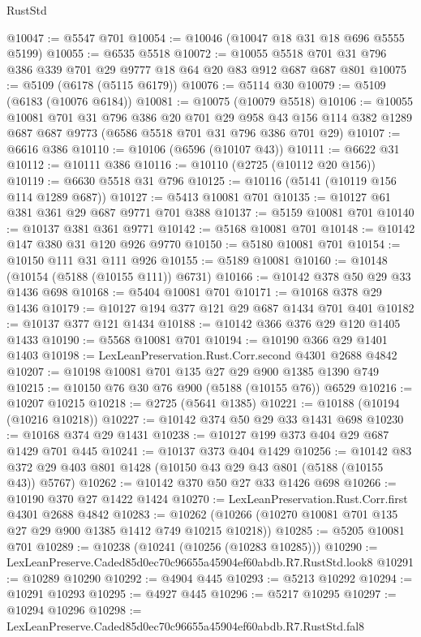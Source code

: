 \begin{lexlean}{RustStd}
\begin{coremodule}
@10047 := @5547 @701
@10054 := @10046 (@10047 @18 @31 @18 @696 @5555 @5199)
@10055 := @6535 @5518
@10072 := @10055 @5518 @701 @31 @796 @386 @339 @701 @29 @9777 @18 @64 @20 @83 @912 @687 @687 @801
@10075 := @5109 (@6178 (@5115 @6179))
@10076 := @5114 @30
@10079 := @5109 (@6183 (@10076 @6184))
@10081 := @10075 (@10079 @5518)
@10106 := @10055
    @10081
    @701
    @31
    @796
    @386
    @20
    @701
    @29
    @958
    @43
    @156
    @114
    @382
    @1289
    @687
    @687
    @9773
    (@6586 @5518 @701 @31 @796 @386 @701 @29)
@10107 := @6616 @386
@10110 := @10106 (@6596 (@10107 @43))
@10111 := @6622 @31
@10112 := @10111 @386
@10116 := @10110 (@2725 (@10112 @20 @156))
@10119 := @6630 @5518 @31 @796
@10125 := @10116 (@5141 (@10119 @156 @114 @1289 @687))
@10127 := @5413 @10081 @701
@10135 := @10127 @61 @381 @361 @29 @687 @9771 @701 @388
@10137 := @5159 @10081 @701
@10140 := @10137 @381 @361 @9771
@10142 := @5168 @10081 @701
@10148 := @10142 @147 @380 @31 @120 @926 @9770
@10150 := @5180 @10081 @701
@10154 := @10150 @111 @31 @111 @926
@10155 := @5189 @10081
@10160 := @10148 (@10154 (@5188 (@10155 @111)) @6731)
@10166 := @10142 @378 @50 @29 @33 @1436 @698
@10168 := @5404 @10081 @701
@10171 := @10168 @378 @29 @1436
@10179 := @10127 @194 @377 @121 @29 @687 @1434 @701 @401
@10182 := @10137 @377 @121 @1434
@10188 := @10142 @366 @376 @29 @120 @1405 @1433
@10190 := @5568 @10081 @701
@10194 := @10190 @366 @29 @1401 @1403
@10198 := LexLeanPreservation.Rust.Corr.second @4301 @2688 @4842
@10207 := @10198 @10081 @701 @135 @27 @29 @900 @1385 @1390 @749
@10215 := @10150 @76 @30 @76 @900 (@5188 (@10155 @76)) @6529
@10216 := @10207 @10215
@10218 := @2725 (@5641 @1385)
@10221 := @10188 (@10194 (@10216 @10218))
@10227 := @10142 @374 @50 @29 @33 @1431 @698
@10230 := @10168 @374 @29 @1431
@10238 := @10127 @199 @373 @404 @29 @687 @1429 @701 @445
@10241 := @10137 @373 @404 @1429
@10256 := @10142 @83 @372 @29 @403 @801 @1428 (@10150 @43 @29 @43 @801 (@5188 (@10155 @43)) @5767)
@10262 := @10142 @370 @50 @27 @33 @1426 @698
@10266 := @10190 @370 @27 @1422 @1424
@10270 := LexLeanPreservation.Rust.Corr.first @4301 @2688 @4842
@10283 := @10262 (@10266 (@10270 @10081 @701 @135 @27 @29 @900 @1385 @1412 @749 @10215 @10218))
@10285 := @5205 @10081 @701
@10289 := @10238 (@10241 (@10256 (@10283 @10285)))
@10290 := LexLeanPreserve.Caded85d0ec70c96655a45904ef60abdb.R7.RustStd.look8
@10291 := @10289 @10290
@10292 := @4904 @445
@10293 := @5213 @10292
@10294 := @10291 @10293
@10295 := @4927 @445
@10296 := @5217 @10295
@10297 := @10294 @10296
@10298 := LexLeanPreserve.Caded85d0ec70c96655a45904ef60abdb.R7.RustStd.fal8

\end{coremodule}
\end{lexlean}

